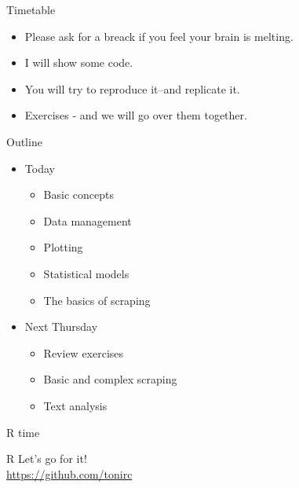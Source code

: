 \documentclass{beamer}
\begin{document}
 \begin{frame}{Timetable}
\begin{itemize}[<+->]
\item Please ask for a breack if you feel your brain is melting.
\item I will show some code.
\item You will try to reproduce it--and replicate it.
\item Exercises - and we will go over them together.
   \end{itemize} 
\end{frame}

\begin{frame}{Outline}
\begin{itemize}
   \item Today
   \begin{itemize}
      \item Basic concepts
      \item Data management
      \item Plotting
      \item Statistical models
      \item The basics of scraping
      \end{itemize}
  \item Next Thursday
        \begin{itemize}
   \item Review exercises
   \item Basic and complex scraping
   \item Text analysis
\end{itemize}
\end{itemize}
\end{frame}

\begin{frame}{R time}
\begin{block}{R} 
Let's go for it! \\
\url{https://github.com/tonirc} 
\end{block}
\end{frame}



  \maketitle
\end{document}
